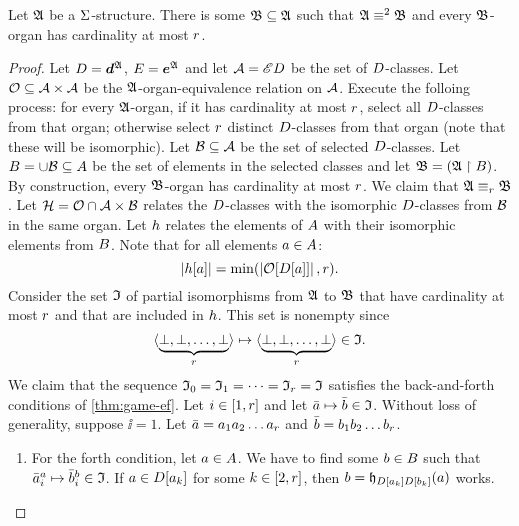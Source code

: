 \begin{lemma}\label{lem:monadic-organ-substructure}
Let $\mathfrak{A}$ be a $\mathrm{\Sigma}$-structure. There is some $\mathfrak{B} \subseteq \mathfrak{A}$ such
that $\mathfrak{A} \equiv^{2} \mathfrak{B}$ and every $\mathfrak{B}$-organ has cardinality at most
$r$.
\end{lemma}
\begin{proof}
Let $D = \bm{d}^{\mathfrak{A}}$, $E = \bm{e}^{\mathfrak{A}}$ and
let $\mathcal{A} = {\mathscr{E}D}$ be the set of $D$-classes.
Let $\mathcal{O} \subseteq {\mathcal{A}\times\mathcal{A}}$ be the $\mathfrak{A}$-organ-equivalence relation
on $\mathcal{A}$.
Execute the folloing process: for every $\mathfrak{A}$-organ, if it has cardinality at
most $r$, select all $D$-classes from that organ; otherwise select $r$
distinct $D$-classes from that organ (note that these will be isomorphic).
Let $\mathcal{B} \subseteq \mathcal{A}$ be the set of selected $D$-classes.
Let $B = \cup \mathcal{B} \subseteq A$ be the set of elements in the selected
classes and let $\mathfrak{B} = (\mathfrak{A} \restriction B)$.
By construction, every $\mathfrak{B}$-organ has cardinality at most $r$.
We claim that $\mathfrak{A} \equiv_{r} \mathfrak{B}$.
Let $\mathcal{H} = \mathcal{O} \cap \mathcal{A}\times\mathcal{B}$ relates the $D$-classes with the
isomorphic $D$-classes from $\mathcal{B}$ in the same organ.
Let $h$ relates the elements of $A$ with their isomorphic elements from
$B$.
Note that for all elements $a \in A$:
\begin{equation}\label{eq:monadic-organ}
  \left|h[a]\right| = \min(\left|\mathcal{O}[D[a]]\right|, r).
\end{equation}
Consider the set $\mathfrak{I}$ of partial isomorphisms from $\mathfrak{A}$ to $\mathfrak{B}$ that
have cardinality at most $r$ and that are included in $h$. This set is
nonempty since
\[
  \langle \underbrace{\bot,\bot,\dots,\bot}_r \rangle \mapsto
  \langle \underbrace{\bot,\bot,\dots,\bot}_r \rangle \in \mathfrak{I}.
\]
We claim that the sequence $\mathfrak{I}_{0} = \mathfrak{I}_{1} = \dots = \mathfrak{I}_{r} = \mathfrak{I}$
satisfies the back-and-forth conditions of \cref{thm:game-ef}.
Let $i \in [1,r]$ and let $\bar{a} \mapsto \bar{b} \in \mathfrak{I}$.
Without loss of generality, suppose $\ii = 1$. Let
$\bar{a} = a_{1}a_{2}\dots a_{r}$ and
$\bar{b} = b_{1}b_{2}\dots b_{r}$.
\begin{enumerate}
  \item For the forth condition, let $a \in A$. We have to find some $b
  \in B$ such that
  $\bar{a}_{i}^{a} \mapsto \bar{b}_{i}^{b} \in \mathfrak{I}$.
  If $a \in D[a_{k}]$ for some $k \in [2,r]$,
  then $b = \mathfrak{h}_{D[a_{k}]D[b_{k}]}(a)$ works.
  

\end{enumerate}
\end{proof}
